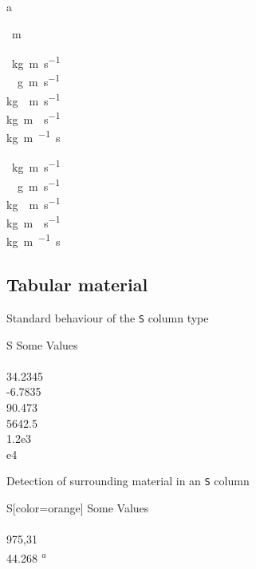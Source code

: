 \documentclass{article}
\def\mabbra{a}
\begin{document}
\unit{\mabbra}\\
\unit{\mabbrb}

\unit{\killer\meter}

\unit{\kilo\gram\metre\per\second} \\
\unit{\kilo{}\gram\metre\per\second} \\
\unit{\kilo\gram{}\metre\per\second} \\
\unit{\kilo\gram\metre{}\per\second} \\
\unit{\kilo\gram\metre\per{}\second}

\unit{\cancel\kilo\gram\metre\per\second} \\
\unit{\kilo\cancel\gram\metre\per\second} \\
\unit{\kilo\gram\cancel\metre\per\second} \\
\unit{\kilo\gram\metre\cancel\per\second} \\
\unit{\kilo\gram\metre\per\cancel\second}


\subsection{Tabular material}

Standard behaviour of the \texttt{S} column type
\begin{center}
\begin{tabular}{S}
\toprule
{Some Values} \\
 \\
34.2345 \\
-6.7835 \\
90.473 \\
5642.5 \\
1.2e3 \\
e4 \\
\bottomrule
\end{tabular}
\end{center}

Detection of surrounding material in an \texttt{S} column
\begin{center}
\begin{tabular}{S[color=orange]}
\toprule
{Some Values} \\
 \\
\color{purple} 975,31 \\
44.268 \textsuperscript{\emph{a}} \\
\bottomrule
\end{tabular}
\end{center}
\end{document}
